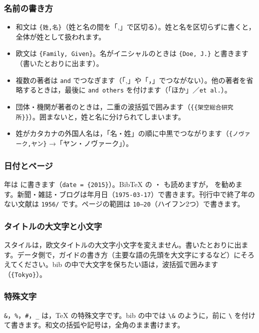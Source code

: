 \subsubsection{名前の書き方}
\begin{itemize}
\item 和文は \texttt{\{姓,名\}}（姓と名の間を「,」で区切る）。姓と名を区切らずに書くと，全体が姓として扱われます。
\item 欧文は \texttt{\{Family, Given\}}。名がイニシャルのときは \texttt{\{Doe, J.\}} と書きます（書いたとおりに出ます）。
\item 複数の著者は \texttt{and} でつなぎます（「,」や「，」でつながない）。他の著者を省略するときは，最後に \texttt{and others} を付けます（「ほか」／\texttt{et al.}）。
\item 団体・機関が著者のときは，二重の波括弧で囲みます（\texttt{\{\{架空総合研究所\}\}}）。囲まないと，姓と名に分けられてしまいます。
\item 姓がカタカナの外国人名は，「名・姓」の順に中黒でつながります（\texttt{\{ノヴァーク,ヤン\}} →「ヤン・ノヴァーク」）。
\end{itemize}

\subsubsection{日付とページ}
年は  に書きます（\texttt{date = \{2015\}}）。BibTeX の ・ も読めますが， を勧めます。新聞・雑誌・ブログは年月日（\texttt{1975-03-17}）で書きます。刊行中で終了年のない文献は \texttt{1956/} です。ページの範囲は \texttt{10--20}（ハイフン2つ）で書きます。

\subsubsection{タイトルの大文字と小文字}
スタイルは，欧文タイトルの大文字小文字を変えません。書いたとおりに出ます。データ側で，ガイドの書き方（主要な語の先頭を大文字にするなど）にそろえてください。bib の中で大文字を保ちたい語は，波括弧で囲みます（\texttt{\{Tokyo\}}）。

\subsubsection{特殊文字}
\texttt{\&}，\texttt{\%}，\texttt{\#}，\texttt{\_} は，\TeX{} の特殊文字です。bib の中では \texttt{\textbackslash\&} のように，前に \texttt{\textbackslash} を付けて書きます。和文の括弧や記号は，全角のまま書けます。

